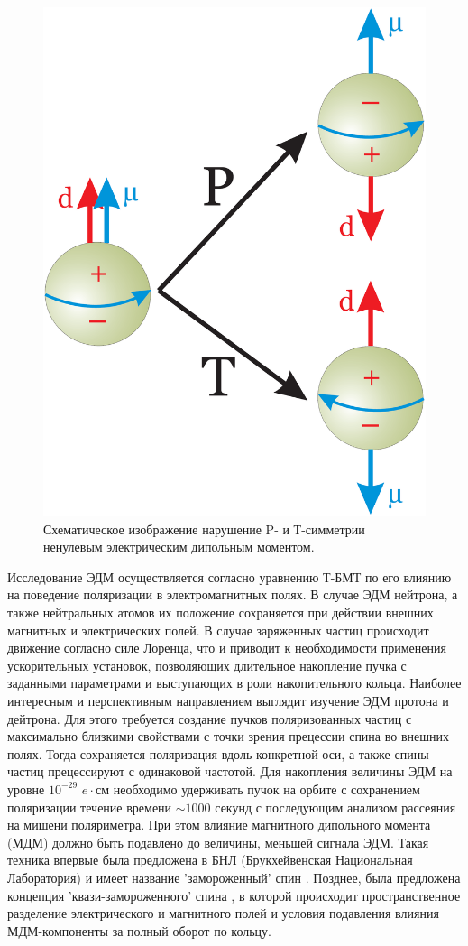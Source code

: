 \begin{figure}
	\centering
	\includegraphics[width=0.4\linewidth]{images/4_EDM_P_T}
	\caption{Схематическое изображение нарушение P- и Т-симметрии ненулевым электрическим дипольным моментом.}
	\label{fig:4edmpt}
\end{figure}

\par	Исследование ЭДМ осуществляется согласно уравнению Т-БМТ по его влиянию на поведение поляризации в электромагнитных полях. В случае ЭДМ нейтрона, а также нейтральных атомов их положение сохраняется при действии внешних магнитных и электрических полей. В случае заряженных частиц происходит движение согласно силе Лоренца, что и приводит к необходимости применения ускорительных установок, позволяющих длительное накопление пучка с заданными параметрами и выступающих в роли накопительного кольца. Наиболее интересным и перспективным направлением выглядит изучение ЭДМ протона и дейтрона. Для этого требуется создание пучков поляризованных частиц с максимально близкими свойствами с точки зрения прецессии спина во внешних полях. Тогда сохраняется поляризация вдоль конкретной оси, а также спины частиц прецессируют с одинаковой частотой. Для накопления величины ЭДМ на уровне $10^{-29}$ $e\cdot \text{см}$ необходимо удерживать пучок на орбите с сохранением поляризации течение времени $\sim1000$ секунд с последующим анализом рассеяния на мишени поляриметра. При этом влияние магнитного дипольного момента (МДМ) должно быть подавлено до величины, меньшей сигнала ЭДМ. Такая техника впервые была предложена в БНЛ (Брукхейвенская Национальная Лаборатория) и имеет название 'замороженный' спин \cite{Farley:edm}. Позднее, была предложена концепция ’квази-замороженного’ спина \cite{QFS}, в которой происходит пространственное разделение электрического и магнитного полей и условия подавления влияния МДМ-компоненты за полный оборот по кольцу.

